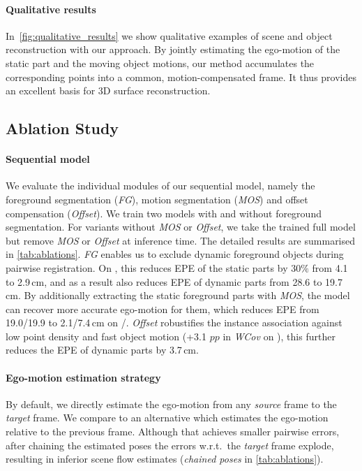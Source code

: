 \paragraph{Qualitative results}

In~\cref{fig:qualitative_results} we show qualitative examples of scene and object reconstruction with our approach. By jointly estimating the ego-motion of the static part and the moving object motions, our method accumulates the corresponding points into a common, motion-compensated frame. It thus provides an excellent basis for 3D surface reconstruction.


\subsection{Ablation Study}
\label{sec:ablation}
\paragraph{Sequential model}
We evaluate the individual modules of our sequential model, namely the foreground segmentation (\textit{FG}), motion segmentation (\textit{MOS}) and offset compensation (\textit{Offset}). We train two models with and without foreground segmentation. For variants without \textit{MOS} or \textit{Offset}, we take the trained full model but remove \textit{MOS} or \textit{Offset} at inference time. The detailed results are summarised in \cref{tab:ablations}. \textit{FG} enables us to exclude dynamic foreground objects during pairwise registration. On \waymo, this reduces EPE of the static parts by $30\%$ from 4.1 to 2.9$\,$cm, and as a result also reduces EPE of dynamic parts from 28.6 to 19.7$\,$cm. By additionally extracting the static foreground parts with \textit{MOS}, the model can recover more accurate ego-motion for them, which reduces EPE from 19.0/19.9 to 2.1/7.4$\,$cm on \waymo/\nuscenes. \textit{Offset} robustifies the instance association against low point density and fast object motion (+3.1 $pp$ in \textit{WCov} on \nuscenes), this further reduces the EPE of dynamic parts by 3.7$\,$cm. 

\paragraph{Ego-motion estimation strategy}
By default, we directly estimate the ego-motion from any \textit{source} frame to the \textit{target} frame. We compare to an alternative which estimates the ego-motion relative to the previous frame. Although that achieves smaller pairwise errors, after chaining the estimated poses the errors w.r.t.\ the \textit{target} frame explode, resulting in inferior scene flow estimates (\textit{chained poses} in \cref{tab:ablations}).

